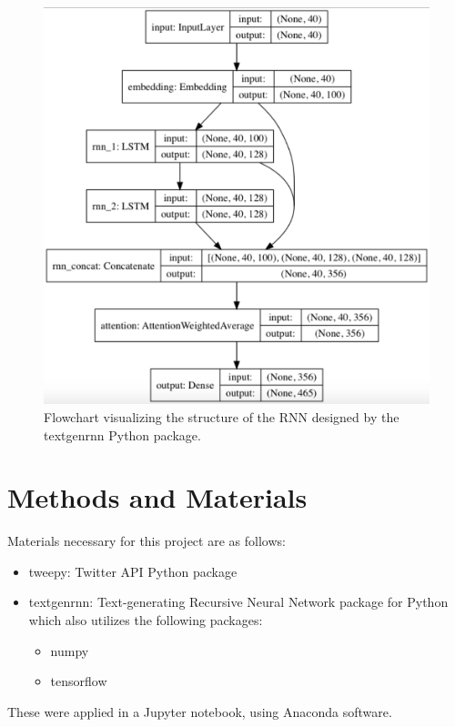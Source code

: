 \documentclass[%
 reprint,
 amsmath,amssymb,
 aps,
]{revtex4-2}
\begin{document}
\begin{figure}[h]
    \centering
    \includegraphics[scale=0.35]{textgenrnnPackageFlowchart.png}
    \caption{Flowchart visualizing the structure of the RNN designed by the textgenrnn Python package.}
    \label{fig:textgenrnn}
\end{figure}

\section{Methods and Materials}

Materials necessary for this project are as follows:
\begin{itemize}
    \item tweepy: Twitter API Python package
    \item textgenrnn: Text-generating Recursive Neural Network package for Python which also utilizes the following packages:
    \begin{itemize}
        \item numpy
        \item tensorflow
    \end{itemize}
\end{itemize}
These were applied in a Jupyter notebook, using Anaconda software.
\end{document}
